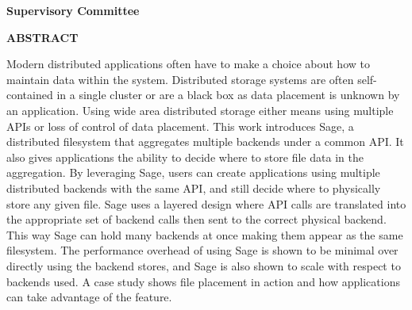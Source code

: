 \newpage
{}

\noindent \textbf{Supervisory Committee}
\tpbreak
\panel

\begin{center}
\textbf{ABSTRACT}
\end{center}


Modern distributed applications often have to make a choice about how to
maintain data within the system. Distributed storage systems are often self-
contained in a single cluster or are a black box as data placement is unknown
by an application. Using wide area distributed storage either means using
multiple APIs or loss of control of data placement. This work introduces Sage,
a distributed filesystem that aggregates multiple backends under a common API.
It also gives applications the ability to decide where to store file data in
the aggregation. By leveraging Sage, users can create applications using
multiple distributed backends with the same API, and still decide where to
physically store any given file. Sage uses a layered design where API calls
are translated into the appropriate set of backend calls then sent to the
correct physical backend. This way Sage can hold many backends at once making
them appear as the same filesystem. The performance overhead of using Sage is
shown to be minimal over directly using the backend stores, and Sage is also
shown to scale with respect to backends used. A case study shows file
placement in action and how applications can take advantage of the feature.
